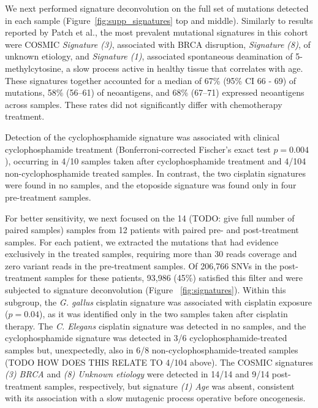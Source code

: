 We next performed signature deconvolution on the full set of mutations detected in each sample (Figure~\ref{fig:supp_signatures} top and middle). Similarly to results reported by Patch et al., the most prevalent mutational signatures in this cohort were COSMIC \textit{Signature (3)}, associated with BRCA disruption, \textit{Signature (8)}, of unknown etiology, and \textit{Signature (1)}, associated spontaneous deamination of 5-methylcytosine, a slow process active in healthy tissue that correlates with age. These signatures together accounted for a median of 67\% (95\% CI 66 - 69) of mutations, 58\% (56--61) of neoantigens, and 68\% (67--71) expressed neoantigens across samples. These rates did not significantly differ with chemotherapy treatment.

Detection of the cyclophosphamide signature was associated with clinical cyclophosphamide treatment (Bonferroni-corrected Fischer's exact test $p = 0.004$), occurring in 4/10 samples taken after cyclophosphamide treatment and 4/104 non-cyclophosphamide treated samples. In contrast, the two cisplatin signatures were found in no samples, and the etoposide signature was found only in four pre-treatment samples.


For better sensitivity, we next focused on the 14 (TODO: give full number of paired samples) samples from 12 patients with paired pre- and post-treatment samples. For each patient, we extracted the mutations that had evidence exclusively in the treated samples, requiring more than 30 reads coverage and zero variant reads in the pre-treatment samples. Of 206,766 SNVs in the post-treatment samples for these patients, 93,986 (45\%) satisfied this filter and were subjected to signature deconvolution (Figure ~\ref{fig:signatures}). Within this subgroup, the \textit{G. gallus} cisplatin signature was associated with cisplatin exposure ($p = 0.04$), as it was identified only in the two samples taken after cisplatin therapy. The \textit{C. Elegans} cisplatin signature was detected in no samples, and the cyclophosphamide signature was detected in 3/6 cyclophosphamide-treated samples but, unexpectedly, also in 6/8 non-cyclophosphamide-treated samples (TODO HOW DOES THIS RELATE TO 4/104 above). The COSMIC signatures \textit{(3) BRCA} and \textit{(8) Unknown etiology} were detected in 14/14 and 9/14 post-treatment samples, respectively, but signature \textit{(1) Age} was absent, consistent with its association with a slow mutagenic process operative before oncogenesis.


